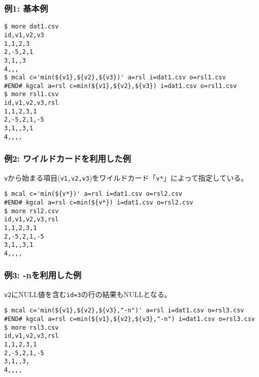\subsubsection*{例1: 基本例}



\begin{Verbatim}[baselinestretch=0.7,frame=single]
$ more dat1.csv
id,v1,v2,v3
1,1,2,3
2,-5,2,1
3,1,,3
4,,,
$ mcal c='min(${v1},${v2},${v3})' a=rsl i=dat1.csv o=rsl1.csv
#END# kgcal a=rsl c=min(${v1},${v2},${v3}) i=dat1.csv o=rsl1.csv
$ more rsl1.csv
id,v1,v2,v3,rsl
1,1,2,3,1
2,-5,2,1,-5
3,1,,3,1
4,,,,
\end{Verbatim}
\subsubsection*{例2: ワイルドカードを利用した例}

\verb|v|から始まる項目(\verb|v1,v2,v3|)をワイルドカード「\verb|v*|」によって指定している。


\begin{Verbatim}[baselinestretch=0.7,frame=single]
$ mcal c='min(${v*})' a=rsl i=dat1.csv o=rsl2.csv
#END# kgcal a=rsl c=min(${v*}) i=dat1.csv o=rsl2.csv
$ more rsl2.csv
id,v1,v2,v3,rsl
1,1,2,3,1
2,-5,2,1,-5
3,1,,3,1
4,,,,
\end{Verbatim}
\subsubsection*{例3: -nを利用した例}

\verb|v2|にNULL値を含む\verb|id=3|の行の結果もNULLとなる。


\begin{Verbatim}[baselinestretch=0.7,frame=single]
$ mcal c='min(${v1},${v2},${v3},"-n")' a=rsl i=dat1.csv o=rsl3.csv
#END# kgcal a=rsl c=min(${v1},${v2},${v3},"-n") i=dat1.csv o=rsl3.csv
$ more rsl3.csv
id,v1,v2,v3,rsl
1,1,2,3,1
2,-5,2,1,-5
3,1,,3,
4,,,,
\end{Verbatim}
